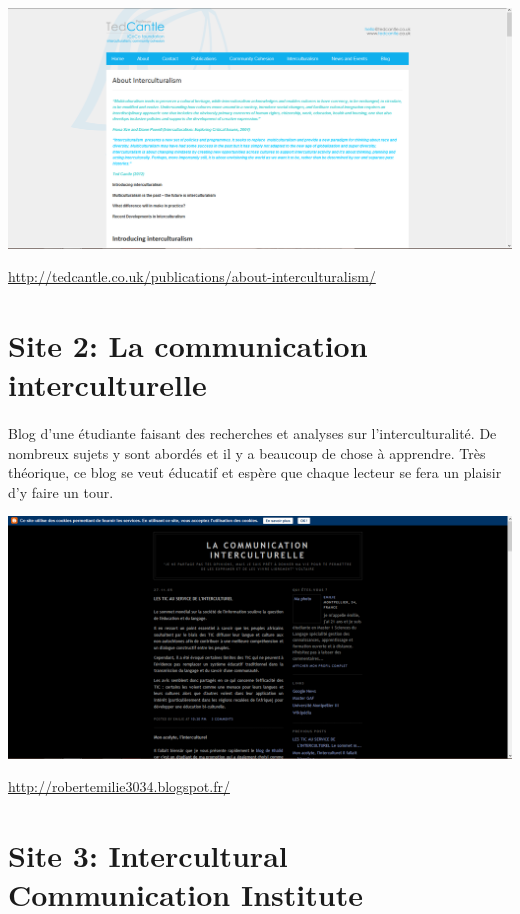 \begin{center}
	\includegraphics[scale=0.25]{interculturality.png}
\end{center}
\url{http://tedcantle.co.uk/publications/about-interculturalism/}

\section{Site 2: La communication interculturelle}

\paragraph{} Blog d’une étudiante faisant des recherches et analyses sur
l’interculturalité. De nombreux sujets y sont abordés et il y a beaucoup de
chose à apprendre. Très théorique, ce blog se veut éducatif et espère que
chaque lecteur se fera un plaisir d’y faire un tour.

\begin{center}
	\includegraphics[scale=0.25]{ComInter.png}
\end{center}
\url{http://robertemilie3034.blogspot.fr/}

\section{Site 3: Intercultural Communication Institute}

